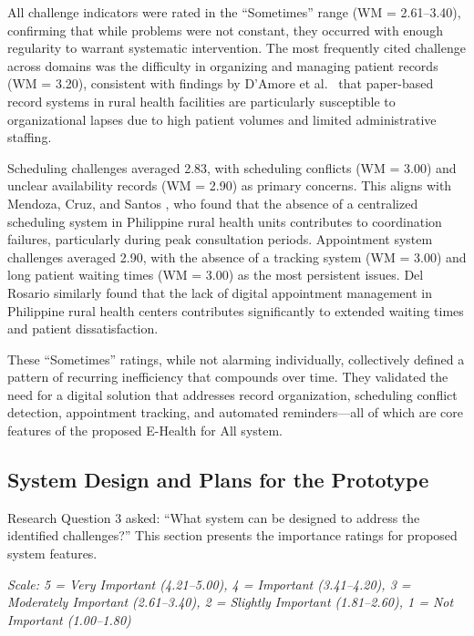 \documentclass{research}
\begin{document}
All challenge indicators were rated in the ``Sometimes'' range (WM = 2.61--3.40), confirming
that while problems were not constant, they occurred with enough regularity to warrant systematic
intervention. The most frequently cited challenge across domains was the difficulty in organizing
and managing patient records (WM = 3.20), consistent with findings by D'Amore et al.\
\cite{DAmore2021} that paper-based record systems in rural health facilities are particularly
susceptible to organizational lapses due to high patient volumes and limited administrative
staffing.

Scheduling challenges averaged 2.83, with scheduling conflicts (WM = 3.00) and unclear
availability records (WM = 2.90) as primary concerns. This aligns with Mendoza, Cruz, and Santos
\cite{Mendoza2023}, who found that the absence of a centralized scheduling system in Philippine
rural health units contributes to coordination failures, particularly during peak consultation
periods. Appointment system challenges averaged 2.90, with the absence of a tracking system
(WM = 3.00) and long patient waiting times (WM = 3.00) as the most persistent issues. Del
Rosario \cite{DelRosario2024} similarly found that the lack of digital appointment management in
Philippine rural health centers contributes significantly to extended waiting times and patient
dissatisfaction.

These ``Sometimes'' ratings, while not alarming individually, collectively defined a pattern of
recurring inefficiency that compounds over time. They validated the need for a digital solution
that addresses record organization, scheduling conflict detection, appointment tracking, and
automated reminders---all of which are core features of the proposed E-Health for All system.

\subsection*{System Design and Plans for the Prototype}

Research Question 3 asked: ``What system can be designed to address the identified challenges?''
This section presents the importance ratings for proposed system features.

\textit{Scale: 5 = Very Important (4.21--5.00), 4 = Important (3.41--4.20), 3 = Moderately
Important (2.61--3.40), 2 = Slightly Important (1.81--2.60), 1 = Not Important (1.00--1.80)}
\end{document}

